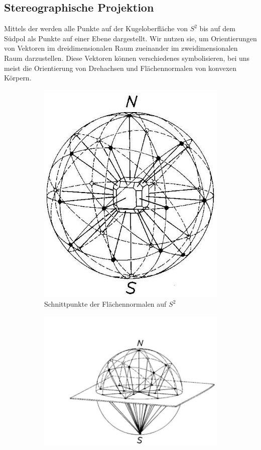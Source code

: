 \subsection{Stereographische Projektion}
Mittels der  werden alle Punkte auf der Kugeloberfläche von $S^2$ bis auf dem Südpol als Punkte auf einer Ebene dargestellt. Wir nutzen sie, um Orientierungen von Vektoren im dreidimensionalen Raum zueinander im zweidimensionalen Raum darzustellen. Diese Vektoren können verschiedenes symbolisieren, bei uns meist die Orientierung von Drehachsen und Flächennormalen von konvexen Körpern.
\begin{figure}%
\centering
\begin{subfigure}{0.4\textwidth}
	\centering
	\includegraphics[width=0.8\linewidth]{./pictures/stpr1.jpg}
	\caption{Schnittpunkte der Flächennormalen auf $S^2$}
\end{subfigure}%
\begin{subfigure}{0.4\textwidth}
	\centering
	\includegraphics[width=1.2\linewidth]{./pictures/stpr2.jpg}

\end{subfigure}
\end{figure}
